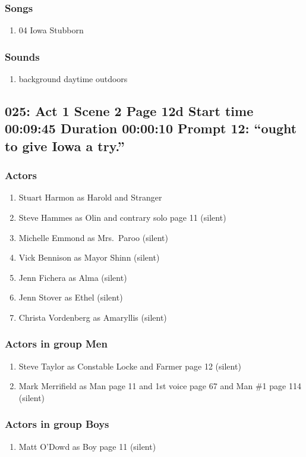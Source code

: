\subsubsection{Songs}
\begin{enumerate}
\item 04 Iowa Stubborn
\end{enumerate}\subsubsection{Sounds}
\begin{enumerate}
\item background daytime outdoors
\end{enumerate}
\subsection{025: Act 1 Scene 2 Page 12d Start time 00:09:45 Duration 00:00:10 Prompt 12: ``ought to give Iowa a try.''}

\subsubsection{Actors}
\begin{enumerate}
\item Stuart Harmon as Harold and Stranger
\item Steve Hammes as Olin and contrary solo page 11 (silent)
\item Michelle Emmond as Mrs.~Paroo (silent)
\item Vick Bennison as Mayor Shinn (silent)
\item Jenn Fichera as Alma (silent)
\item Jenn Stover as Ethel (silent)
\item Christa Vordenberg as Amaryllis (silent)
\end{enumerate}
\subsubsection{Actors in group Men}
\begin{enumerate}
\item Steve Taylor as Constable Locke and Farmer page 12 (silent)
\item Mark Merrifield as Man page 11 and 1st voice page 67 and Man \#1 page 114 (silent)
\end{enumerate}
\subsubsection{Actors in group Boys}
\begin{enumerate}
\item Matt O'Dowd as Boy page 11 (silent)
\end{enumerate}
